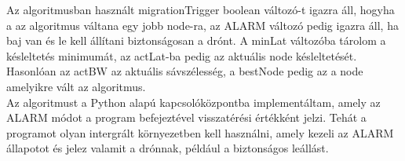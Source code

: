 Az algoritmusban használt migrationTrigger boolean változó-t igazra áll, hogyha a az algoritmus váltana egy jobb node-ra, az ALARM változó pedig igazra áll, ha baj van és le kell állítani biztonságosan a drónt. A minLat változóba tárolom a késleltetés minimumát, az actLat-ba pedig az aktuális node késleltetését. Hasonlóan az actBW az aktuális sávszélesség, a bestNode pedig az a node amelyikre vált az algoritmus. \\

\noindent
Az algoritmust a Python alapú kapcsolóközpontba implementáltam, amely az ALARM módot a program befejeztével visszatérési értékként jelzi. Tehát a programot olyan intergrált környezetben kell használni, amely kezeli az ALARM állapotot és jelez valamit a drónnak, például a biztonságos leállást.
